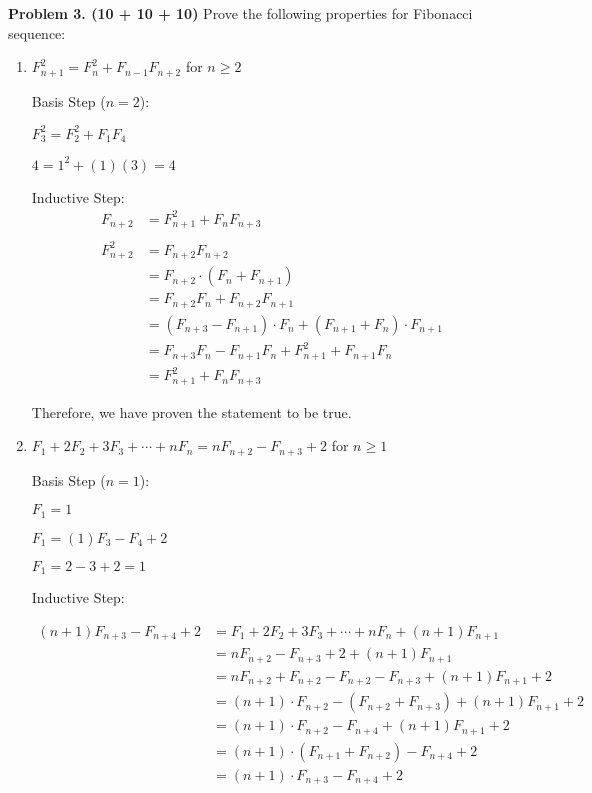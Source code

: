\documentclass[12pt,twoside]{article}
\begin{document}
{\bf Problem 3. (10 + 10 + 10)}
%
Prove the following properties for Fibonacci sequence:

\begin{enumerate}
	\item
	$F^2_{n+1} = F^2_{n} + F_{n-1}F_{n+2}$ for $n \geq 2$

	Basis Step ($n = 2$):

	$F_3^2 = F_2^2 + F_1F_4$

	$4 = 1^2 + (1)(3) = 4$

	Inductive Step:
	\begin{align*}
		F_{n+2} &= F^2_{n+1} + F_{n}F_{n+3}\\
		\\
		F_{n+2}^2 &= F_{n+2}F_{n+2}\\
		&= F_{n+2}\cdot(F_n + F_{n+1})\\
		&= F_{n+2}F_n + F_{n+2}F_{n+1}\\
		&= (F_{n+3} - F_{n+1})\cdot F_n + (F_{n+1} + F_{n})\cdot F_{n+1}\\
		&= F_{n+3}F_{n} - F_{n+1}F_{n}+F_{n+1}^2 +F_{n+1}F_{n}\\
		&= F_{n+1}^2 + F_{n}F_{n+3}
	\end{align*}

	Therefore, we have proven the statement to be true.

	\newpage
	\item
	$F_1 + 2F_2 + 3F_3 + \cdots + nF_{n} = nF_{n+2}-F_{n+3} +2$ for $n \geq 1$

	Basis Step ($n = 1$):

	$F_1 = 1$

	$F_1 = (1)F_3 - F_4 + 2$

	$F_1 = 2 - 3 + 2 = 1$

	Inductive Step:

	\begin{align*}
		(n+1)F_{n+3} - F_{n+4} + 2 &= F_1 + 2F_2 + 3F_3 + \cdots + nF_{n} + (n+1)F_{n+1}\\
		&= nF_{n+2}-F_{n+3} +2 + (n+1)F_{n+1}\\
		&= nF_{n+2}+F_{n+2}- F_{n+2} -F_{n+3} + (n+1)F_{n+1} +2\\
		&= (n+1)\cdot F_{n+2} - (F_{n+2} + F_{n+3}) + (n+1)F_{n+1} +2\\
		&= (n+1)\cdot F_{n+2} - F_{n+4} + (n+1)F_{n+1} +2\\
		&= (n+1)\cdot (F_{n+1}+F_{n+2}) - F_{n+4}+2\\
		&= (n+1)\cdot F_{n+3} - F_{n+4}+2\\
	\end{align*}


\end{enumerate}
\end{document}
